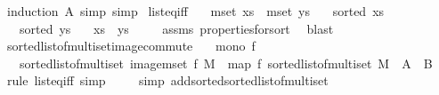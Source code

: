 \begin{isabellebody}
%
\isatagproof
{}\isamarkupfalse%
\ {\isacharparenleft}{\kern0pt}induction\ A{\isacharcomma}{\kern0pt}\ simp{\isacharcomma}{\kern0pt}\ simp{\isacharparenright}{\kern0pt}%
\endisatagproof
{\isafoldproof}%
%
\isadelimproof
\isanewline
%
\endisadelimproof
\isanewline
{}\isamarkupfalse%
\ list{\isacharunderscore}{\kern0pt}eq{\isacharunderscore}{\kern0pt}iff{\isacharcolon}{\kern0pt}\isanewline
\ \ \ {\isachardoublequoteopen}mset\ xs\ {\isacharequal}{\kern0pt}\ mset\ ys{\isachardoublequoteclose}\isanewline
\ \ \ {\isachardoublequoteopen}sorted\ xs{\isachardoublequoteclose}\isanewline
\ \ \ {\isachardoublequoteopen}sorted\ ys{\isachardoublequoteclose}\isanewline
\ \ \ {\isachardoublequoteopen}xs\ {\isacharequal}{\kern0pt}\ ys{\isachardoublequoteclose}\ \isanewline
%
\isadelimproof
\ \ %
\endisadelimproof
%
\isatagproof
{}\isamarkupfalse%
\ assms\ properties{\isacharunderscore}{\kern0pt}for{\isacharunderscore}{\kern0pt}sort\ \isamarkupfalse%
\ blast%
\endisatagproof
{\isafoldproof}%
%
\isadelimproof
\isanewline
%
\endisadelimproof
\isanewline
{}\isamarkupfalse%
\ sorted{\isacharunderscore}{\kern0pt}list{\isacharunderscore}{\kern0pt}of{\isacharunderscore}{\kern0pt}multiset{\isacharunderscore}{\kern0pt}image{\isacharunderscore}{\kern0pt}commute{\isacharcolon}{\kern0pt}\isanewline
\ \ \ {\isachardoublequoteopen}mono\ f{\isachardoublequoteclose}\isanewline
\ \ \ {\isachardoublequoteopen}sorted{\isacharunderscore}{\kern0pt}list{\isacharunderscore}{\kern0pt}of{\isacharunderscore}{\kern0pt}multiset\ {\isacharparenleft}{\kern0pt}image{\isacharunderscore}{\kern0pt}mset\ f\ M{\isacharparenright}{\kern0pt}\ {\isacharequal}{\kern0pt}\ map\ f\ {\isacharparenleft}{\kern0pt}sorted{\isacharunderscore}{\kern0pt}list{\isacharunderscore}{\kern0pt}of{\isacharunderscore}{\kern0pt}multiset\ M{\isacharparenright}{\kern0pt}{\isachardoublequoteclose}\ {\isacharparenleft}{\kern0pt}\ {\isachardoublequoteopen}{\isacharquery}{\kern0pt}A\ {\isacharequal}{\kern0pt}\ {\isacharquery}{\kern0pt}B{\isachardoublequoteclose}{\isacharparenright}{\kern0pt}\isanewline
%
\isadelimproof
\ \ %
\endisadelimproof
%
\isatagproof
{}\isamarkupfalse%
\ {\isacharparenleft}{\kern0pt}rule\ list{\isacharunderscore}{\kern0pt}eq{\isacharunderscore}{\kern0pt}iff{\isacharcomma}{\kern0pt}\ simp{\isacharparenright}{\kern0pt}\isanewline
\ \ \ \isamarkupfalse%
\ {\isacharparenleft}{\kern0pt}simp\ add{\isacharcolon}{\kern0pt}sorted{\isacharunderscore}{\kern0pt}sorted{\isacharunderscore}{\kern0pt}list{\isacharunderscore}{\kern0pt}of{\isacharunderscore}{\kern0pt}multiset{\isacharparenright}{\kern0pt}\isanewline

\end{isabellebody}

